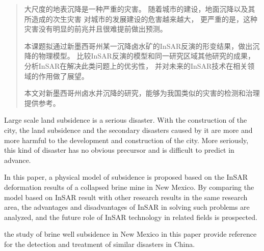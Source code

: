 

\begin{abstract}
  大尺度的地表沉降是一种严重的灾害。
  随着城市的建设，地面沉降以及其所造成的次生灾害
  对城市的发展建设的危害越来越大，
  更严重的是，这种灾害没有明显的前兆并且很难提前做出预测。
  
  本课题拟通过新墨西哥州某一沉降卤水矿的InSAR反演的形变结果，做出沉降的物理模型。
  比较InSAR反演的模型和同一研究区域其他研究的成果，分析InSAR在解决此类问题上的优劣性，
  并对未来的InSAR技术在相关领域的作用做了展望。

  本文对新墨西哥州卤水井沉降的研究，能够为我国类似的灾害的检测和治理提供参考。
\end{abstract}

\begin{abstract*}
  Large scale land subsidence is a serious disaster. 
  With the construction of the city, 
  the land subsidence and the secondary disasters caused by it 
  are more and more harmful to the development and construction of the city. 
  More seriously, this kind of disaster has no obvious precursor 
  and is difficult to predict in advance.

  In this paper, a physical model of subsidence is proposed 
  based on the InSAR deformation results of a collapsed brine mine in New Mexico. 
  By comparing the model based on InSAR result with other research results in the same research area, 
  the advantages and disadvantages of InSAR in solving such problems are analyzed, 
  and the future role of InSAR technology in related fields is prospected.

  the study of brine well subsidence in New Mexico in this paper 
  provide reference for the detection and treatment of similar disasters in China.
\end{abstract*}
